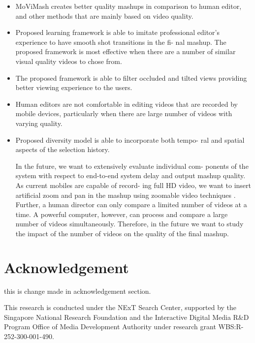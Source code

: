 \documentclass{new}
\begin{document}
\begin{itemize}
\item MoViMash creates better quality mashups in comparison to
human editor, and other methods that are mainly based on
video quality.

\item Proposed learning framework is able to imitate professional
editor's experience to have smooth shot transitions in the fi-
nal mashup. The proposed framework is most effective when there are a number of similar visual quality videos to chose
from.

\item The proposed framework is able to filter occluded and tilted
views providing better viewing experience to the users.

\item Human editors are not comfortable in editing videos that are
recorded by mobile devices, particularly when there are large
number of videos with varying quality.
\item Proposed diversity model is able to incorporate both tempo-
ral and spatial aspects of the selection history.

In the future, we want to extensively evaluate individual com-
ponents of the system with respect to end-to-end system delay and
output mashup quality. As current mobiles are capable of record-
ing full HD video, we want to insert artificial zoom and pan in the
mashup using zoomable video techniques \cite{11}. Further, a human
director can only compare a limited number of videos at a time.
A powerful computer, however, can process and compare a large
number of videos simultaneously. Therefore, in the future we want
to study the impact of the number of videos on the quality of the
final mashup.
\end{itemize}

\section*{Acknowledgement}
this is change made in acknowledgement section.

This research is conducted under the NExT Search Center, supported by the Singapore National Research Foundation and the Interactive Digital Media R\&D Program Office of Media Development Authority under research grant WBS:R-252-300-001-490.





\end{document}
